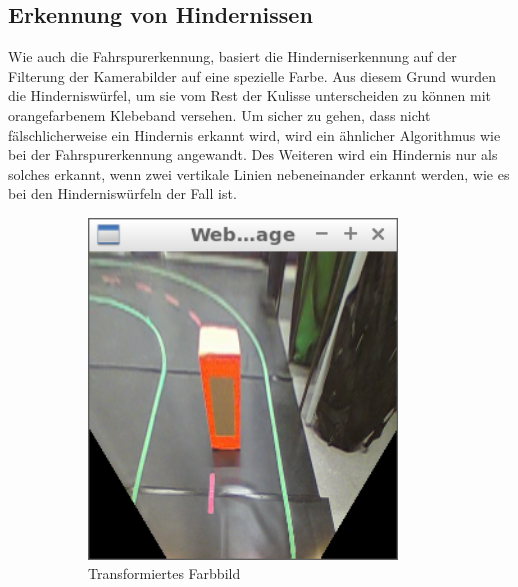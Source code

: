 \subsection{Erkennung von Hindernissen}
\label{sec:hinderniserkennung}
Wie auch die Fahrspurerkennung, basiert die Hinderniserkennung auf der Filterung der Kamerabilder auf eine spezielle Farbe. Aus diesem Grund wurden die Hinderniswürfel, um sie vom Rest der Kulisse unterscheiden zu können mit orangefarbenem Klebeband versehen. Um sicher zu gehen, dass nicht fälschlicherweise ein Hindernis erkannt wird, wird ein ähnlicher Algorithmus wie bei der Fahrspurerkennung angewandt. Des Weiteren wird ein Hindernis nur als solches erkannt, wenn zwei vertikale Linien nebeneinander erkannt werden, wie es bei den Hinderniswürfeln der Fall ist. 
\begin{figure}[h]
	\centering
	\begin{subfigure}{0.45\textwidth}
		\centering
		\includegraphics[width=0.9\textwidth]{images/obstacle_original.png}
		\caption{Transformiertes Farbbild}
	\end{subfigure}
	\begin{subfigure}{0.45\textwidth}
		\centering

\end{subfigure}
\end{figure}

